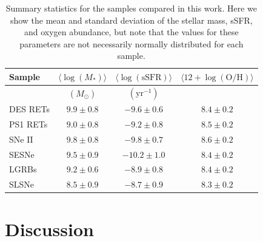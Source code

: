 \documentclass[fleqn,usenatbib,]{mnras}
\begin{document}
\begin{table}
    \centering
    \caption{Summary statistics for the samples compared in this work. Here we show the mean and standard deviation of the stellar mass, sSFR, and oxygen abundance, but note that the values for these parameters are not necessarily normally distributed for each sample. }
    \begin{tabular}{lccc}
    \toprule
   Sample & $\langle\log \left(M_*\right)\rangle$ &  $\langle\log \left(\mathrm{sSFR}\right)\rangle$ &$\langle12+\log\left(\mathrm{O/H}\right) \rangle$\\
   \midrule
   {} & $\left( M_{\odot}\right)$ & $\left(\mathrm{yr}^{-1} \right)$& \\
   \midrule
   DES RETs &$9.9 \pm 0.8$ & $-9.6 \pm 0.6 $ &$ 8.4 \pm 0.2$ \\
    PS1 RETs &$9.0 \pm 0.8$ & $-9.2 \pm 0.8 $ &$ 8.5 \pm 0.2$ \\
    SNe II &$9.8 \pm 0.8$ & $-9.8 \pm 0.7 $ &$ 8.6 \pm 0.2$ \\
    SESNe &$9.5 \pm 0.9$ & $-10.2 \pm 1.0 $ &$ 8.4 \pm 0.2$ \\
    LGRBs &$9.2 \pm 0.6$ & $-8.9 \pm 0.8 $ &$ 8.4 \pm 0.2$ \\
    SLSNe &$8.5 \pm 0.9$ & $-8.7 \pm 0.9 $ &$ 8.3 \pm 0.2$ \\
\bottomrule
    \end{tabular}
    
    \label{tab:summary}
\end{table}

\section{Discussion }
\label{sec:discussion}
\end{document}
